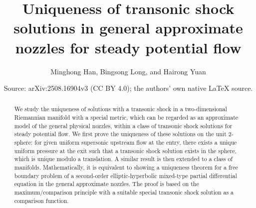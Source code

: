 \documentclass[10pt,a4paper]{amsart}
\title{Uniqueness of transonic shock solutions in general approximate nozzles for steady potential flow}
\author{Minghong Han, Bingsong Long, and Hairong Yuan}
\date{Source: arXiv:2508.16904v3 (CC BY 4.0); the authors' own native \LaTeX{} source.}
\numberwithin{equation}{section}
\begin{document}
\maketitle
	\begin{abstract}
We study the uniqueness of solutions with a transonic shock in a two-dimensional Riemannian manifold with a special metric, which can be regarded as an approximate model of the general physical nozzles, within a class of transonic shock solutions for steady potential flow. We first prove the uniqueness of these solutions on the unit 2-sphere: for given uniform supersonic upstream flow at the entry, there exists a unique uniform pressure at the exit such that a transonic shock solution exists in the sphere, which is unique modulo a translation. A similar result is then extended to a class of manifolds. Mathematically, it is equivalent to showing a uniqueness theorem for a free boundary problem of a second-order elliptic-hyperbolic mixed-type partial differential equation in the general approximate nozzles. The proof is based on the maximum/comparison principle with a suitable special transonic shock solution as a comparison function.
	\end{abstract}
\end{document}
